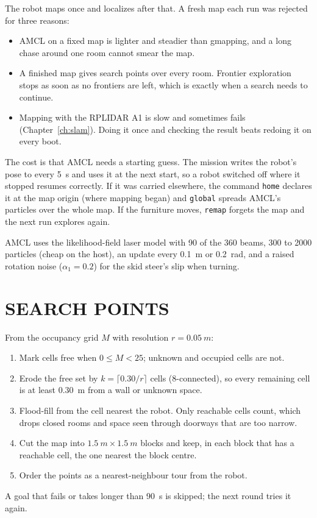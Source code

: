 The robot maps once and localizes after that. A fresh map each run was
rejected for three reasons:
\begin{itemize}[nosep]
\item AMCL on a fixed map is lighter and steadier than gmapping, and a long
  chase around one room cannot smear the map.
\item A finished map gives search points over every room. Frontier
  exploration stops as soon as no frontiers are left, which is exactly when a
  search needs to continue.
\item Mapping with the RPLIDAR A1 is slow and sometimes fails
  (Chapter~\ref{ch:slam}). Doing it once and checking the result beats
  redoing it on every boot.
\end{itemize}
The cost is that AMCL needs a starting guess. The mission writes the robot's
pose to  every \SI{5}{s} and uses it at the next
start, so a robot switched off where it stopped resumes correctly. If it was
carried elsewhere, the command \texttt{home} declares it at the map origin
(where mapping began) and \texttt{global} spreads AMCL's particles over the
whole map. If the furniture moves, \texttt{remap} forgets the map and the
next run explores again.

AMCL uses the likelihood-field laser model with 90 of the 360 beams, 300 to
2000 particles (cheap on the host), an update every \SI{0.1}{m} or
\SI{0.2}{rad}, and a raised rotation noise ($\alpha_1=0.2$) for the skid
steer's slip when turning.

\section{SEARCH POINTS}
\label{sec:waypoints}

From the occupancy grid $M$ with resolution $r=\SI{0.05}{m}$:
\begin{enumerate}[nosep]
\item Mark cells free when $0\le M<25$; unknown and occupied cells are not.
\item Erode the free set by $k=\lceil 0.30/r\rceil$ cells (8-connected), so
  every remaining cell is at least \SI{0.30}{m} from a wall or unknown space.
\item Flood-fill from the cell nearest the robot. Only reachable cells count,
  which drops closed rooms and space seen through doorways that are too
  narrow.
\item Cut the map into $\SI{1.5}{m}\times\SI{1.5}{m}$ blocks and keep, in
  each block that has a reachable cell, the one nearest the block centre.
\item Order the points as a nearest-neighbour tour from the robot.
\end{enumerate}
A goal that fails or takes longer than \SI{90}{s} is skipped; the next round
tries it again.

